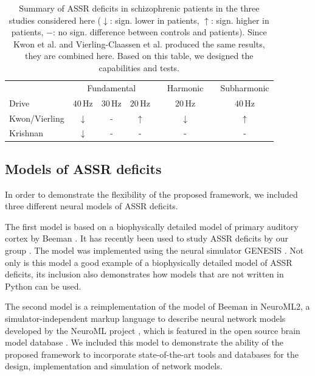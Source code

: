 \documentclass[a4paper,10pt]{article}
\begin{document}
\begin{table}[h!]
\centering
\label{Tab:Experiments} 
\caption{Summary of ASSR deficits in schizophrenic patients in the three studies considered here ($\downarrow$: sign. lower in patients, $\uparrow$: sign. higher in patients, $-$: no sign. difference between controls and patients). Since Kwon et al. \cite{Kwon1999} and Vierling-Claassen et al. \cite{Vierling2008}
produced the same results, they are combined here. Based on this table, we designed the capabilities and tests.}
\begin{tabular}{lccccccc}\toprule
& \multicolumn{3}{c}{Fundamental}& \phantom{a} & Harmonic & \phantom{a} & Subharmonic \\
\cmidrule{2-4} \cmidrule{6-6} \cmidrule{8-8}
Drive& $40$\,Hz  & $30$\,Hz  & $20$\,Hz&  & $20$\,Hz & &$40$\,Hz \\
\midrule 
Kwon/Vierling & $\downarrow$& -& $\uparrow$& &$\downarrow$ & & $\uparrow$\\ \addlinespace

Krishnan & $\downarrow$& -& -& &- & &- \\
\bottomrule
\end{tabular}
\end{table}


\subsection{Models of ASSR deficits}
In order to demonstrate the flexibility of the proposed framework, we included three different neural models of ASSR deficits.

The first model is based on a biophysically detailed model of primary auditory cortex by Beeman \cite{Beeman2013}. It has recently been used to study 
ASSR deficits by our group \cite{Metzner2016}. The model was implemented using the neural simulator GENESIS \cite{Bower1992,Bower1998}. Not only is this model
a good example of a biophysically detailed model of ASSR deficits, its inclusion also demonstrates how models that are not written in Python can be used.

The second model is a reimplementation of the model of Beeman in NeuroML2, a simulator-independent markup language to describe neural network models developed by the
NeuroML project \cite{Cannon2014}, which is featured in the open source brain model database \cite{Gleeson2012}. We included this model to demonstrate the ability of the proposed framework
to incorporate state-of-the-art tools and databases for the design, implementation and simulation of network models.
\end{document}
